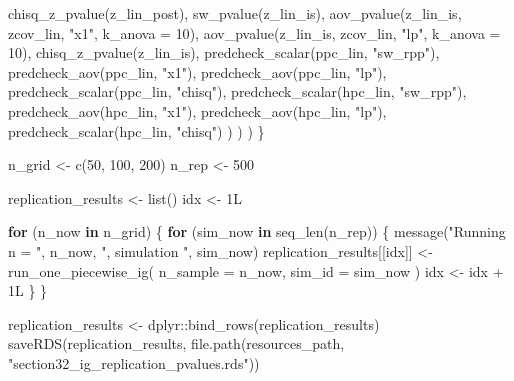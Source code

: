 \documentclass[
  english,
  letterpaper,
  DIV=11,
  numbers=noendperiod]{scrartcl}
\newenvironment{Shaded}{\begin{snugshade}}{\end{snugshade}}
\newcommand{\AttributeTok}[1]{\textcolor[rgb]{0.40,0.45,0.13}{#1}}
\newcommand{\ControlFlowTok}[1]{\textcolor[rgb]{0.00,0.23,0.31}{\textbf{#1}}}
\newcommand{\DecValTok}[1]{\textcolor[rgb]{0.68,0.00,0.00}{#1}}
\newcommand{\FunctionTok}[1]{\textcolor[rgb]{0.28,0.35,0.67}{#1}}
\newcommand{\NormalTok}[1]{\textcolor[rgb]{0.00,0.23,0.31}{#1}}
\newcommand{\OtherTok}[1]{\textcolor[rgb]{0.00,0.23,0.31}{#1}}
\newcommand{\SpecialCharTok}[1]{\textcolor[rgb]{0.37,0.37,0.37}{#1}}
\newcommand{\StringTok}[1]{\textcolor[rgb]{0.13,0.47,0.30}{#1}}
\begin{document}
\begin{Shaded}
\begin{Highlighting}[]
        \FunctionTok{chisq\_z\_pvalue}\NormalTok{(z\_lin\_post),}
        \FunctionTok{sw\_pvalue}\NormalTok{(z\_lin\_is),}
        \FunctionTok{aov\_pvalue}\NormalTok{(z\_lin\_is, zcov\_lin, }\StringTok{"x1"}\NormalTok{, }\AttributeTok{k\_anova =} \DecValTok{10}\NormalTok{),}
        \FunctionTok{aov\_pvalue}\NormalTok{(z\_lin\_is, zcov\_lin, }\StringTok{"lp"}\NormalTok{, }\AttributeTok{k\_anova =} \DecValTok{10}\NormalTok{),}
        \FunctionTok{chisq\_z\_pvalue}\NormalTok{(z\_lin\_is),}
        \FunctionTok{predcheck\_scalar}\NormalTok{(ppc\_lin, }\StringTok{"sw\_rpp"}\NormalTok{),}
        \FunctionTok{predcheck\_aov}\NormalTok{(ppc\_lin, }\StringTok{"x1"}\NormalTok{),}
        \FunctionTok{predcheck\_aov}\NormalTok{(ppc\_lin, }\StringTok{"lp"}\NormalTok{),}
        \FunctionTok{predcheck\_scalar}\NormalTok{(ppc\_lin, }\StringTok{"chisq"}\NormalTok{),}
        \FunctionTok{predcheck\_scalar}\NormalTok{(hpc\_lin, }\StringTok{"sw\_rpp"}\NormalTok{),}
        \FunctionTok{predcheck\_aov}\NormalTok{(hpc\_lin, }\StringTok{"x1"}\NormalTok{),}
        \FunctionTok{predcheck\_aov}\NormalTok{(hpc\_lin, }\StringTok{"lp"}\NormalTok{),}
        \FunctionTok{predcheck\_scalar}\NormalTok{(hpc\_lin, }\StringTok{"chisq"}\NormalTok{)}
\NormalTok{      )}
\NormalTok{    )}
\NormalTok{  )}
\NormalTok{\}}

\NormalTok{n\_grid }\OtherTok{\textless{}{-}} \FunctionTok{c}\NormalTok{(}\DecValTok{50}\NormalTok{, }\DecValTok{100}\NormalTok{, }\DecValTok{200}\NormalTok{)}
\NormalTok{n\_rep }\OtherTok{\textless{}{-}} \DecValTok{500}

\NormalTok{replication\_results }\OtherTok{\textless{}{-}} \FunctionTok{list}\NormalTok{()}
\NormalTok{idx }\OtherTok{\textless{}{-}} \DecValTok{1}\NormalTok{L}

\ControlFlowTok{for}\NormalTok{ (n\_now }\ControlFlowTok{in}\NormalTok{ n\_grid) \{}
  \ControlFlowTok{for}\NormalTok{ (sim\_now }\ControlFlowTok{in} \FunctionTok{seq\_len}\NormalTok{(n\_rep)) \{}
    \FunctionTok{message}\NormalTok{(}\StringTok{"Running n = "}\NormalTok{, n\_now, }\StringTok{", simulation "}\NormalTok{, sim\_now)}
\NormalTok{    replication\_results[[idx]] }\OtherTok{\textless{}{-}} \FunctionTok{run\_one\_piecewise\_ig}\NormalTok{(}
      \AttributeTok{n\_sample =}\NormalTok{ n\_now,}
      \AttributeTok{sim\_id =}\NormalTok{ sim\_now}
\NormalTok{    )}
\NormalTok{    idx }\OtherTok{\textless{}{-}}\NormalTok{ idx }\SpecialCharTok{+} \DecValTok{1}\NormalTok{L}
\NormalTok{  \}}
\NormalTok{\}}

\NormalTok{replication\_results }\OtherTok{\textless{}{-}}\NormalTok{ dplyr}\SpecialCharTok{::}\FunctionTok{bind\_rows}\NormalTok{(replication\_results)}
\FunctionTok{saveRDS}\NormalTok{(replication\_results, }\FunctionTok{file.path}\NormalTok{(resources\_path, }\StringTok{"section32\_ig\_replication\_pvalues.rds"}\NormalTok{))}
\end{Highlighting}
\end{Shaded}
\end{document}
